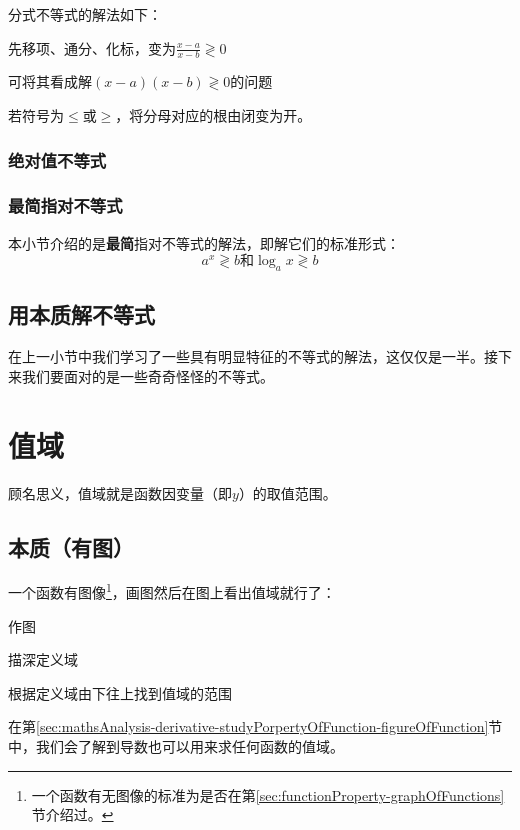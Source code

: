 分式不等式的解法如下：

\begin{enumlist}
	\item 先移项、通分、化标，变为$\frac{x-a}{x-b}\gtrless0$
	\item 可将其看成解$(x-a)(x-b)\gtrless0$的问题
\end{enumlist}

若符号为$\leq$或$\geq$，将分母对应的根由闭变为开。

\subsubsection{绝对值不等式}

\subsubsection{最简指对不等式}
本小节介绍的是\textbf{最简}指对不等式的解法，即解它们的标准形式：\[a^x\gtrless b\text{和}\log_ax\gtrless b\]

\subsection[本质]{用本质解不等式}
在上一小节中我们学习了一些具有明显特征的不等式的解法，这仅仅是一半。接下来我们要面对的是一些奇奇怪怪的不等式。

\section{值域}
顾名思义，值域就是函数因变量（即$y$）的取值范围。

\subsection[本质]{本质（有图）}
一个函数有图像\footnote{一个函数有无图像的标准为是否在第\ref{sec:functionProperty-graphOfFunctions}节介绍过。}，画图然后在图上看出值域就行了：

\begin{enumlist}
\item 作图
\item 描深定义域
\item 根据定义域由下往上找到值域的范围
\end{enumlist}

在第\ref{sec:mathsAnalysis-derivative-studyPorpertyOfFunction-figureOfFunction}节中，我们会了解到导数也可以用来求任何函数的值域。

